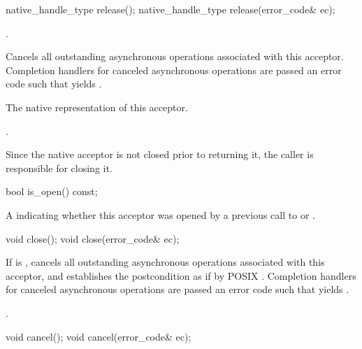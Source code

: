 \begin{itemdecl}
native_handle_type release();
native_handle_type release(error_code& ec);
\end{itemdecl}

\begin{itemdescr}
\pnum
\requires {}.

\pnum
\effects Cancels all outstanding asynchronous operations associated with this acceptor.
Completion handlers for canceled asynchronous operations are passed an error code 
such that  yields .

\pnum
\returns The native representation of this acceptor.

\pnum
\postconditions {}.

\pnum
\remarks Since the native acceptor is not closed prior to returning it,
the caller is responsible for closing it.
\end{itemdescr}

\begin{itemdecl}
bool is_open() const;
\end{itemdecl}

\begin{itemdescr}
\pnum
\returns A  indicating whether this acceptor was opened by a previous call to  or .
\end{itemdescr}

\begin{itemdecl}
void close();
void close(error_code& ec);
\end{itemdecl}

\begin{itemdescr}
\pnum
\effects If  is , cancels all outstanding asynchronous operations associated with this acceptor, and establishes the postcondition as if by POSIX . Completion handlers for canceled asynchronous operations are passed an error code  such that  yields .

\pnum
\postconditions {}.
\end{itemdescr}

\begin{itemdecl}
void cancel();
void cancel(error_code& ec);
\end{itemdecl}

